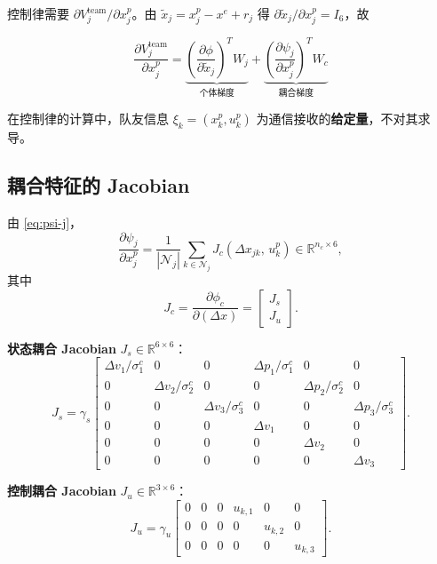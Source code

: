 \documentclass[12pt,a4paper]{ctexart}
\begin{document}
控制律需要 $\partial V_j^{\mathrm{team}}/\partial x_j^p$。由 $\tilde{x}_j = x_j^p - x^e + r_j$ 得 $\partial\tilde{x}_j/\partial x_j^p = I_6$，故

\begin{equation}\label{eq:grad-V-team}
\boxed{
\frac{\partial V_j^{\mathrm{team}}}{\partial x_j^p}
= \underbrace{\left(\frac{\partial \phi}{\partial \tilde{x}_j}\right)^{\!T} W_j}_{\text{个体梯度}}
+ \underbrace{\left(\frac{\partial \psi_j}{\partial x_j^p}\right)^{\!T} W_c}_{\text{耦合梯度}}
}
\end{equation}

在控制律的计算中，队友信息 $\xi_k = (x_k^p, u_k^p)$ 为通信接收的\textbf{给定量}，不对其求导。

\subsection{耦合特征的 Jacobian}\label{sec:jac-coupling}

由 \eqref{eq:psi-j}，
\[
\frac{\partial \psi_j}{\partial x_j^p}
= \frac{1}{|\mathcal{N}_j|} \sum_{k \in \mathcal{N}_j} J_c(\Delta x_{jk},\, u_k^p) \in \mathbb{R}^{n_c \times 6},
\]
其中
\begin{equation}\label{eq:Jc}
J_c = \frac{\partial \phi_c}{\partial(\Delta x)} = \begin{bmatrix} J_s \\ J_u \end{bmatrix}.
\end{equation}

\textbf{状态耦合 Jacobian} $J_s \in \mathbb{R}^{6 \times 6}$：
\begin{equation}\label{eq:Js}
J_s = \gamma_s \begin{bmatrix}
\Delta v_1/\sigma_1^c & 0 & 0 & \Delta p_1/\sigma_1^c & 0 & 0 \\
0 & \Delta v_2/\sigma_2^c & 0 & 0 & \Delta p_2/\sigma_2^c & 0 \\
0 & 0 & \Delta v_3/\sigma_3^c & 0 & 0 & \Delta p_3/\sigma_3^c \\
0 & 0 & 0 & \Delta v_1 & 0 & 0 \\
0 & 0 & 0 & 0 & \Delta v_2 & 0 \\
0 & 0 & 0 & 0 & 0 & \Delta v_3
\end{bmatrix}.
\end{equation}

\textbf{控制耦合 Jacobian} $J_u \in \mathbb{R}^{3 \times 6}$：
\begin{equation}\label{eq:Ju}
J_u = \gamma_u \begin{bmatrix}
0 & 0 & 0 & u_{k,1} & 0 & 0 \\
0 & 0 & 0 & 0 & u_{k,2} & 0 \\
0 & 0 & 0 & 0 & 0 & u_{k,3}
\end{bmatrix}.
\end{equation}
\end{document}

